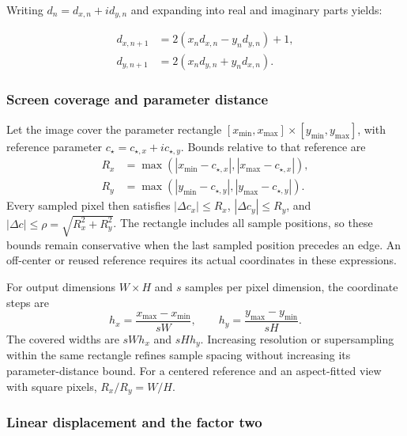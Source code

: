 Writing \(d_n = d_{x,n} + i d_{y,n}\) and expanding into real and imaginary parts yields:

\begin{align}
  d_{x,n+1} &= 2(x_n d_{x,n} - y_n d_{y,n}) + 1, \label{eq:st-dzdc-real} \\
  d_{y,n+1} &= 2(x_n d_{y,n} + y_n d_{x,n}). \label{eq:st-dzdc-imag}
\end{align}

\subsubsection{Screen coverage and parameter distance}
\label{subsec:ref-orbit-view-bounds}

Let the image cover the parameter rectangle
$[x_{\min},x_{\max}]\times[y_{\min},y_{\max}]$, with reference parameter
$c_\star=c_{\star,x}+ic_{\star,y}$. Bounds relative to that reference are
\begin{align}
 R_x&=\max(|x_{\min}-c_{\star,x}|,|x_{\max}-c_{\star,x}|),\\
 R_y&=\max(|y_{\min}-c_{\star,y}|,|y_{\max}-c_{\star,y}|).
 \label{eq:periodicity-screen-radii}
\end{align}
Every sampled pixel then satisfies
$|\Delta c_x|\le R_x$, $|\Delta c_y|\le R_y$, and
$|\Delta c|\le\rho=\sqrt{R_x^2+R_y^2}$. The rectangle includes all sample
positions, so these bounds remain conservative when the last sampled position
precedes an edge. An off-center or reused reference requires its actual
coordinates in these expressions.

For output dimensions $W\times H$ and $s$ samples per pixel dimension, the
coordinate steps are
\begin{equation}
 h_x=\frac{x_{\max}-x_{\min}}{sW},\qquad
 h_y=\frac{y_{\max}-y_{\min}}{sH}.
 \label{eq:periodicity-pixel-spacing}
\end{equation}
The covered widths are $sWh_x$ and $sHh_y$. Increasing resolution or
supersampling within the same rectangle refines sample spacing without
increasing its parameter-distance bound. For a centered reference and an
aspect-fitted view with square pixels, $R_x/R_y=W/H$.

\subsubsection{Linear displacement and the factor two}
\label{subsec:ref-orbit-linear-radius}


